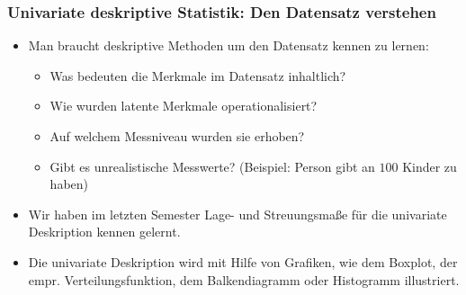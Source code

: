 \documentclass[usenames,dvipsnames,handout]{beamer}
\begin{document}
\begin{frame}
 \frametitle{Univariate deskriptive Statistik: Den Datensatz verstehen} %

  \begin{itemize}
   \item {Man braucht deskriptive Methoden um den Datensatz kennen zu lernen:
   \begin{itemize}
   \item{Was bedeuten die Merkmale im Datensatz inhaltlich?}\pause
   \item{Wie wurden latente Merkmale operationalisiert?}\pause
   \item{Auf welchem Messniveau wurden sie erhoben?}\pause
   \item{Gibt es unrealistische Messwerte? (Beispiel: Person gibt an $100$ Kinder zu haben)}
   \end{itemize}
   }\pause
    \item {Wir haben im letzten Semester  Lage- und Streuungsmaße für die univariate
    Deskription kennen gelernt.}\pause
    \item{Die univariate Deskription wird mit Hilfe von Grafiken, wie dem Boxplot, der empr.
    Verteilungsfunktion, dem Balkendiagramm oder Histogramm illustriert.}
   
  \end{itemize}
  
\end{frame}
\end{document}
